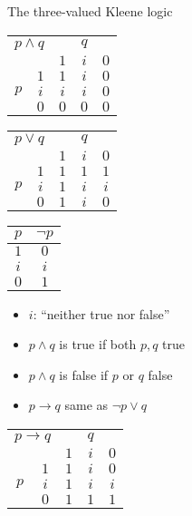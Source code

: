 \documentclass{beamer}
\begin{document}
\begin{frame}{The three-valued Kleene logic}

\begin{tabular}{cc|ccc}
\multicolumn{2}{c|}{$p\land q$} & \multicolumn{3}{c}{$q$} \\
& & $1$ & $i$ & $0$ \\
\hline
    & $1$ & $1$ & $i$ & $0$ \\
$p$ & $i$ & $i$ & $i$ & $0$ \\
    & $0$ & $0$ & $0$ & $0$
\end{tabular}
\hfill
\begin{tabular}{cc|ccc}
\multicolumn{2}{c|}{$p\lor q$} & \multicolumn{3}{c}{$q$} \\
& & $1$ & $i$ & $0$ \\
\hline
    & $1$ & $1$ & $1$ & $1$ \\
$p$ & $i$ & $1$ & $i$ & $i$ \\
    & $0$ & $1$ & $i$ & $0$
\end{tabular}
\hfill
\begin{tabular}{c|c}
$p$ & $\lnot p$ \\
\hline
$1$ & $0$ \\
$i$ & $i$ \\
$0$ & $1$
\end{tabular}

\vfill

\begin{minipage}{.5\textwidth}
\begin{itemize}
\item $i$: ``neither true nor false''
\item $p\land q$ is true if both $p,q$ true
\item $p\land q$ is false if $p$ or $q$ false
\item $p\to q$ same as $\lnot p\lor q$
\end{itemize}
\end{minipage}
\hfill
\begin{tabular}{cc|ccc}
\multicolumn{2}{c|}{$p\to q$} & \multicolumn{3}{c}{$q$} \\
& & $1$ & $i$ & $0$ \\
\hline
    & $1$ & $1$ & $i$ & $0$ \\
$p$ & $i$ & $1$ & $i$ & $i$ \\
    & $0$ & $1$ & $1$ & $1$
\end{tabular}

\end{frame}
\end{document}
